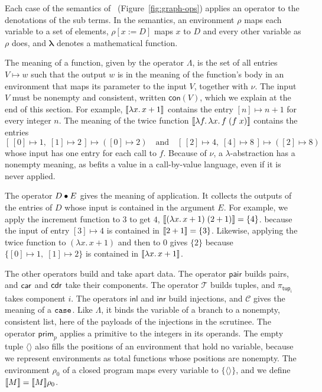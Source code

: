 Each case of the semantics of \fpc\ (Figure~\ref{fig:graph-ops})
applies an operator to the denotations of the sub terms. In
the semantics, an environment $\rho$ maps each variable to a set of
elements, $\rho[x{:=}D]$ maps $x$ to $D$ and every other variable as
$\rho$ does, and $\boldsymbol{\lambda}$ denotes a mathematical
function.

The meaning of a function, given by the operator $\Lambda$, is the set
of all entries $V \mapsto w$ such that the output $w$ is in the
meaning of the function's body in an environment that maps its
parameter to the input $V$, together with $\nu$. The input $V$ must be
nonempty and consistent, written $\mathsf{con}(V)$, which we explain
at the end of this section. For example, $\llbracket \lambda x.\, x + 1 \rrbracket$
contains the entry $[n] \mapsto n{+}1$ for every integer $n$. The
meaning of the twice function
$\llbracket \lambda f.\, \lambda x.\, f\;(f\;x) \rrbracket$ contains the entries
\[
  [\, [0] \mapsto 1,\; [1] \mapsto 2 \,] \mapsto ([0] \mapsto 2)
  \quad\text{and}\quad
  [\, [2] \mapsto 4,\; [4] \mapsto 8 \,] \mapsto ([2] \mapsto 8)
\]
whose input has one entry for each call to $f$. Because of $\nu$, a
$\lambda$-abstraction has a nonempty meaning, as befits a value in a
call-by-value language, even if it is never applied.

The operator $D \mathbin{\bullet} E$ gives the meaning of application. It collects
the outputs of the entries of $D$ whose input is contained in the
argument $E$. For example, we apply the increment function to $3$ to get $4$,
$\llbracket (\lambda x.\, x + 1)\; (2 + 1) \rrbracket = \{4\}$.
because the input of entry $[3] \mapsto 4$ is contained in
$\llbracket 2 + 1 \rrbracket = \{3\}$. Likewise, applying the twice function to
$(\lambda x.\, x + 1)$ and then to $0$ gives $\{2\}$ because
$\{[0] \mapsto 1,\; [1] \mapsto 2\}$
is contained in
$\llbracket \lambda x.\, x + 1 \rrbracket$.

The other operators build and take apart data. The operator
$\mathsf{pair}$ builds pairs, and $\mathsf{car}$ and $\mathsf{cdr}$ take their
components. The operator $\mathcal{T}$ builds tuples, and
$\pi_{\mathsf{tup}_i}$ takes component $i$. The operators
$\mathsf{inl}$ and $\mathsf{inr}$ build injections, and $\mathcal{C}$
gives the meaning of a $\mathtt{case}$. Like $\Lambda$, it binds the
variable of a branch to a nonempty, consistent list, here of the
payloads of the injections in the scrutinee. The operator
$\mathsf{prim}_p$ applies a primitive to the integers in its operands.
The empty tuple $\langle\rangle$ also fills the positions of an
environment that hold no variable, because we represent environments
as total functions whose positions are nonempty. The environment
$\rho_0$ of a closed program maps every variable to
$\{\langle\rangle\}$, and we define $\llbracket M \rrbracket = \llbracket M \rrbracket\rho_0$.

